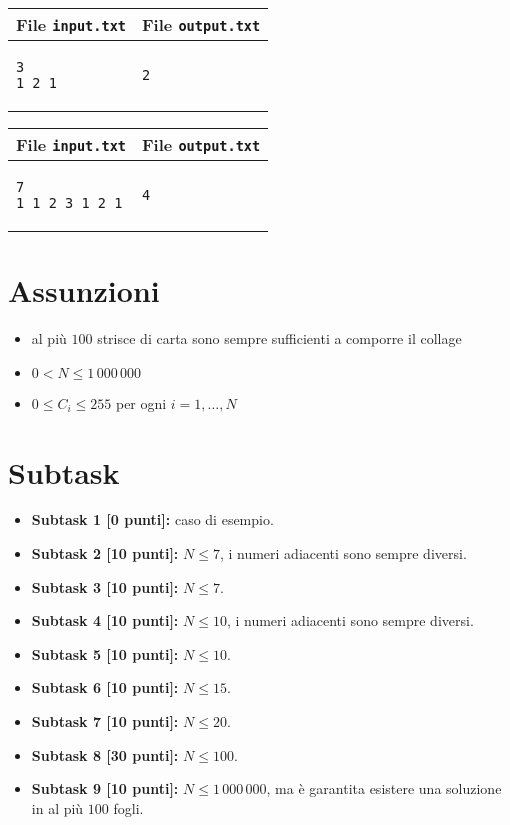 \documentclass[a4paper,11pt]{article}
\begin{document}
  
    \noindent
    \begin{tabular}{p{11cm}|p{5cm}}
    \toprule
    \textbf{File \texttt{input.txt}}
    & \textbf{File \texttt{output.txt}}
    \\
    \midrule
    \scriptsize
    \begin{verbatim}
3 
1 2 1
\end{verbatim}
    &
    \scriptsize
    \begin{verbatim}
2
\end{verbatim}
    \\
    \bottomrule
    \end{tabular}
  
    \noindent
    \begin{tabular}{p{11cm}|p{5cm}}
    \toprule
    \textbf{File \texttt{input.txt}}
    & \textbf{File \texttt{output.txt}}
    \\
    \midrule
    \scriptsize
    \begin{verbatim}
7
1 1 2 3 1 2 1
\end{verbatim}
    &
    \scriptsize
    \begin{verbatim}
4
\end{verbatim}
    \\
    \bottomrule
    \end{tabular}

    
\section*{Assunzioni}
  \begin{itemize}
    \item al più $100$ strisce di carta sono sempre sufficienti a comporre il collage
    \item $0 < N ≤ 1\,000\,000$
    \item $0 \leq C_{i} \leq 255$ per ogni $i=1,\ldots, N$
  \end{itemize}
  
\section*{Subtask}
\begin{itemize}
\item \textbf{Subtask 1 [0 punti]:} caso di esempio.
\item \textbf{Subtask 2 [10 punti]:} $N \leq 7$, i numeri adiacenti sono sempre diversi.
\item \textbf{Subtask 3 [10 punti]:} $N \leq 7$.
\item \textbf{Subtask 4 [10 punti]:} $N \leq 10$, i numeri adiacenti sono sempre diversi.
\item \textbf{Subtask 5 [10 punti]:} $N \leq 10$.
\item \textbf{Subtask 6 [10 punti]:} $N \leq 15$.
\item \textbf{Subtask 7 [10 punti]:} $N \leq 20$.
\item \textbf{Subtask 8 [30 punti]:} $N \leq 100$.
\item \textbf{Subtask 9 [10 punti]:} $N \le 1\,000\,000$, ma è garantita esistere una soluzione in al più $100$ fogli.  
\end{itemize}
  
\end{document}
